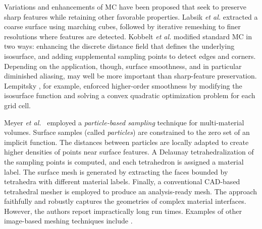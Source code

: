 Variations and enhancements of MC have been proposed that seek to preserve sharp features while retaining other favorable properties.  Labsik \textit{et al.} \cite{labsik_2002} extracted a coarse surface using marching cubes, followed by iterative remeshing to finer resolutions where features are detected.  Kobbelt \textit{et al.} \cite{kobbelt_2001} modified standard MC in two ways:  enhancing the discrete distance field that defines the underlying isosurface, and adding supplemental sampling points to detect edges and corners. Depending on the application, though, surface smoothness, and in particular diminished aliasing, may well be more important than sharp-feature preservation. Lempitsky \cite{lempitsky_2010}, for example, enforced higher-order smoothness by modifying the isosurface function and solving a convex quadratic optimization problem for each grid cell.

Meyer \textit{et al.}~\cite{meyer_2008} employed a \textit{particle-based sampling} technique for multi-material volumes. Surface samples (called \textit{particles}) are constrained to the zero set of an implicit function. The distances between particles are locally adapted to create higher densities of points near surface features. A Delaunay tetrahedralization of the sampling points is computed, and each tetrahedron is assigned a material label. The surface mesh is generated by extracting the faces bounded by tetrahedra with different material labels. Finally, a conventional CAD-based tetrahedral mesher is employed to produce an analysis-ready mesh. The approach faithfully and robustly captures the geometries of complex material interfaces. However, the authors report impractically long run times.
Examples of other image-based meshing techniques include \cite{fang_2009, mohamed_2004, jermyn_2013, boissonnat_2009}.

